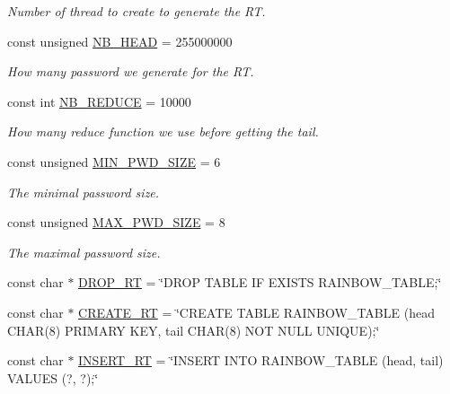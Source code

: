\begin{DoxyCompactItemize}
\begin{DoxyCompactList}\small\item\em Number of thread to create to generate the RT. \end{DoxyCompactList}\item 
const unsigned \hyperlink{namespacebe_1_1esi_1_1secl_1_1pn_a3f7aaccb1bf4e47f92d72bf9b2471328}{N\+B\+\_\+\+H\+E\+AD} = 255000000
\begin{DoxyCompactList}\small\item\em How many password we generate for the RT. \end{DoxyCompactList}\item 
const int \hyperlink{namespacebe_1_1esi_1_1secl_1_1pn_a9434f9e96778e243fcb677633df38598}{N\+B\+\_\+\+R\+E\+D\+U\+CE} = 10000
\begin{DoxyCompactList}\small\item\em How many reduce function we use before getting the tail. \end{DoxyCompactList}\item 
const unsigned \hyperlink{namespacebe_1_1esi_1_1secl_1_1pn_ac4d6305d2a5baed196042f8a30533620}{M\+I\+N\+\_\+\+P\+W\+D\+\_\+\+S\+I\+ZE} = 6
\begin{DoxyCompactList}\small\item\em The minimal password size. \end{DoxyCompactList}\item 
const unsigned \hyperlink{namespacebe_1_1esi_1_1secl_1_1pn_a2e3241ac36dabdb668b68028e097dded}{M\+A\+X\+\_\+\+P\+W\+D\+\_\+\+S\+I\+ZE} = 8
\begin{DoxyCompactList}\small\item\em The maximal password size. \end{DoxyCompactList}\item 
const char $\ast$ \hyperlink{namespacebe_1_1esi_1_1secl_1_1pn_a6dae14cb83aa871e50c9aaea7f776055}{D\+R\+O\+P\+\_\+\+RT} = \char`\"{}D\+R\+OP T\+A\+B\+LE IF E\+X\+I\+S\+TS R\+A\+I\+N\+B\+O\+W\+\_\+\+T\+A\+B\+LE;\char`\"{}
\item 
const char $\ast$ \hyperlink{namespacebe_1_1esi_1_1secl_1_1pn_ab39f379fcf2d9342096df70dcf998d32}{C\+R\+E\+A\+T\+E\+\_\+\+RT} = \char`\"{}C\+R\+E\+A\+TE T\+A\+B\+LE R\+A\+I\+N\+B\+O\+W\+\_\+\+T\+A\+B\+LE (head C\+H\+AR(8) P\+R\+I\+M\+A\+RY K\+EY, tail C\+H\+AR(8) N\+OT N\+U\+LL U\+N\+I\+Q\+UE);\char`\"{}
\item 
const char $\ast$ \hyperlink{namespacebe_1_1esi_1_1secl_1_1pn_a93b0970fb08c37d478307bfadfb3b775}{I\+N\+S\+E\+R\+T\+\_\+\+RT} = \char`\"{}I\+N\+S\+E\+RT I\+N\+TO R\+A\+I\+N\+B\+O\+W\+\_\+\+T\+A\+B\+LE (head, tail) V\+A\+L\+U\+ES (?, ?);\char`\"{}
\end{DoxyCompactItemize}


